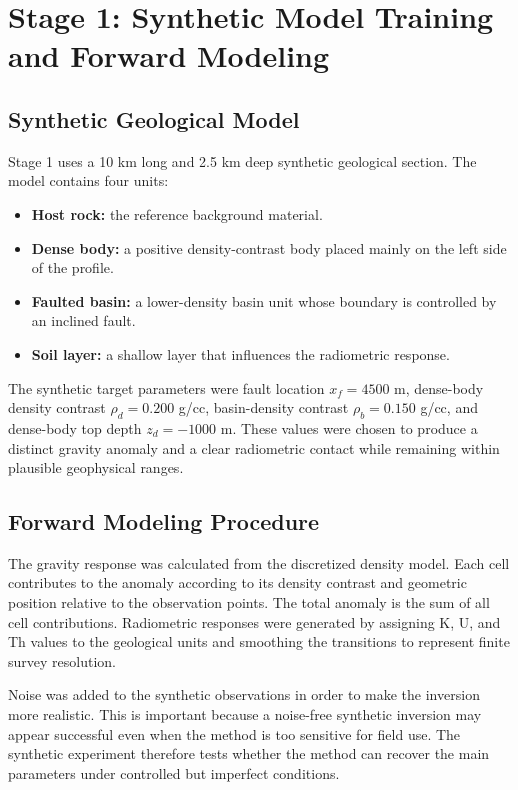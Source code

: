 \documentclass[12pt,a4paper]{article}
\begin{document}
\clearpage
\section{Stage 1: Synthetic Model Training and Forward Modeling}
\subsection{Synthetic Geological Model}
Stage 1 uses a 10 km long and 2.5 km deep synthetic geological section. The model contains four units:
\begin{itemize}
    \item \textbf{Host rock:} the reference background material.
    \item \textbf{Dense body:} a positive density-contrast body placed mainly on the left side of the profile.
    \item \textbf{Faulted basin:} a lower-density basin unit whose boundary is controlled by an inclined fault.
    \item \textbf{Soil layer:} a shallow layer that influences the radiometric response.
\end{itemize}
The synthetic target parameters were fault location $x_f=4500$ m, dense-body density contrast $\rho_d=0.200$ g/cc, basin-density contrast $\rho_b=0.150$ g/cc, and dense-body top depth $z_d=-1000$ m. These values were chosen to produce a distinct gravity anomaly and a clear radiometric contact while remaining within plausible geophysical ranges.

\subsection{Forward Modeling Procedure}
The gravity response was calculated from the discretized density model. Each cell contributes to the anomaly according to its density contrast and geometric position relative to the observation points. The total anomaly is the sum of all cell contributions. Radiometric responses were generated by assigning K, U, and Th values to the geological units and smoothing the transitions to represent finite survey resolution.

Noise was added to the synthetic observations in order to make the inversion more realistic. This is important because a noise-free synthetic inversion may appear successful even when the method is too sensitive for field use. The synthetic experiment therefore tests whether the method can recover the main parameters under controlled but imperfect conditions.
\end{document}
